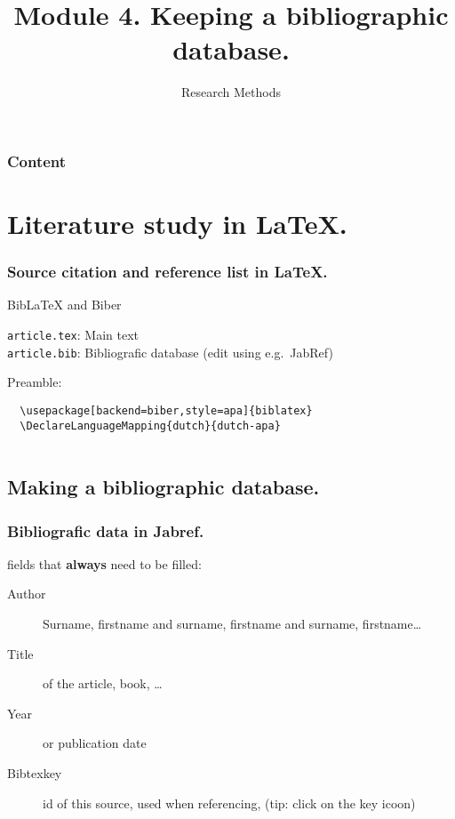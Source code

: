 \documentclass[aspectratio=169]{beamer}
\title{Module 4. Keeping a bibliographic database.}
\subtitle{Research Methods}
\author{\lecturers}   %
\date{\academicyear}
\begin{document}
\begin{frame}
  \maketitle
\end{frame}

\begin{frame}
  \frametitle{Content}

  \tableofcontents
\end{frame}

\section{Literature study in {\LaTeX}.}

\begin{frame}[fragile]
  \frametitle{Source citation and reference list in {\LaTeX}.}

  Bib{\LaTeX} and Biber

  \vspace{18pt}

  \verb|article.tex|: Main text\\
  \verb|article.bib|: Bibliografic database (edit using e.g.~JabRef)

  \vspace{18pt}

  Preamble:

  \begin{verbatim}
  \usepackage[backend=biber,style=apa]{biblatex}
  \DeclareLanguageMapping{dutch}{dutch-apa}
  
  \end{verbatim}

\end{frame}

\subsection{Making a bibliographic database.}

\begin{frame}
  \frametitle{Bibliografic data in Jabref.}

  fields that \textbf{always} need to be filled:

  \begin{description}
    \item[Author] Surname, firstname and surname, firstname and surname, firstname\ldots
    \item[Title] of the article, book, \ldots
    \item[Year] or publication date
    \item[Bibtexkey] id of this source, used when referencing, (tip: click on the key icoon)
  \end{description}
\end{frame}
\end{document}
